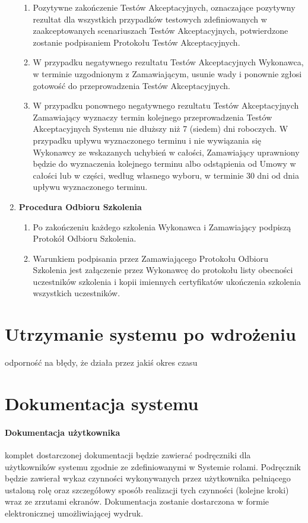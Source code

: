 \documentclass{article}
\begin{document}
\begin{enumerate}
\begin{enumerate}
\item Pozytywne zakończenie Testów Akceptacyjnych, oznaczające pozytywny rezultat dla wszystkich przypadków testowych zdefiniowanych w zaakceptowanych scenariuszach Testów Akceptacyjnych, potwierdzone zostanie podpisaniem Protokołu Testów Akceptacyjnych.
\item W przypadku negatywnego rezultatu Testów Akceptacyjnych Wykonawca, w terminie uzgodnionym z Zamawiającym, usunie wady i ponownie zgłosi gotowość do przeprowadzenia Testów Akceptacyjnych. 
\item W przypadku ponownego negatywnego rezultatu Testów Akceptacyjnych Zamawiający wyznaczy termin kolejnego przeprowadzenia Testów Akceptacyjnych Systemu nie dłuższy niż 7 (siedem) dni roboczych. W przypadku upływu wyznaczonego terminu i nie wywiązania się Wykonawcy ze wskazanych uchybień w całości, Zamawiający uprawniony będzie do wyznaczenia kolejnego terminu albo odstąpienia od Umowy w całości lub w części, według własnego wyboru, w terminie 30 dni od dnia upływu wyznaczonego terminu. 
\end{enumerate}
\item \textbf{Procedura Odbioru Szkolenia}
\begin{enumerate}
\item Po zakończeniu każdego szkolenia Wykonawca i Zamawiający podpiszą Protokół Odbioru Szkolenia.
\item Warunkiem podpisania przez Zamawiającego Protokołu Odbioru Szkolenia jest załączenie przez Wykonawcę do protokołu listy obecności uczestników szkolenia i kopii imiennych certyfikatów ukończenia szkolenia wszystkich uczestników.
\end{enumerate}
\end{enumerate}

\section{Utrzymanie systemu po wdrożeniu}
odporność na błędy, że działa przez jakiś okres czasu

\section{Dokumentacja systemu}
\paragraph{Dokumentacja użytkownika} komplet dostarczonej dokumentacji będzie zawierać podręczniki dla użytkowników systemu zgodnie ze zdefiniowanymi w Systemie rolami. Podręcznik będzie zawierał wykaz czynności wykonywanych przez użytkownika pełniącego ustaloną rolę oraz szczegółowy sposób realizacji tych czynności (kolejne kroki) wraz ze zrzutami ekranów. Dokumentacja zostanie dostarczona w formie elektronicznej umożliwiającej wydruk.
\end{document}
